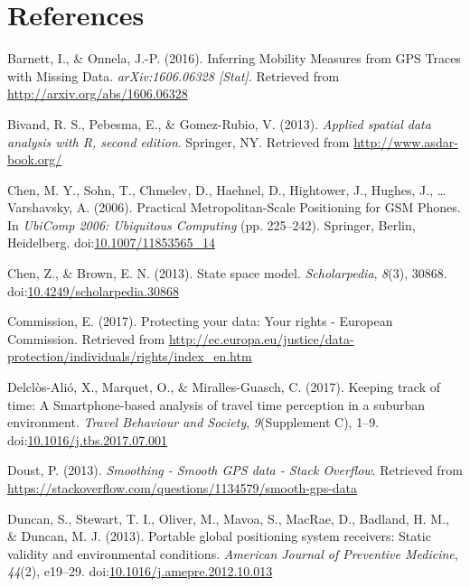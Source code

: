 \documentclass[english,man]{apa6}
\theoremstyle{definition}
\theoremstyle{definition}
\theoremstyle{definition}
\theoremstyle{remark}
\begin{document}
\newpage

\section{References}\label{references}

\setlength{\parindent}{-0.5in} \setlength{\leftskip}{0.5in}

\hypertarget{refs}{}
\hypertarget{ref-barnett_inferring_2016}{}
Barnett, I., \& Onnela, J.-P. (2016). Inferring Mobility Measures from
GPS Traces with Missing Data. \emph{arXiv:1606.06328 {[}Stat{]}}.
Retrieved from \url{http://arxiv.org/abs/1606.06328}

\hypertarget{ref-sp2}{}
Bivand, R. S., Pebesma, E., \& Gomez-Rubio, V. (2013). \emph{Applied
spatial data analysis with R, second edition}. Springer, NY. Retrieved
from \url{http://www.asdar-book.org/}

\hypertarget{ref-chen_practical_2006}{}
Chen, M. Y., Sohn, T., Chmelev, D., Haehnel, D., Hightower, J., Hughes,
J., \ldots{} Varshavsky, A. (2006). Practical Metropolitan-Scale
Positioning for GSM Phones. In \emph{UbiComp 2006: Ubiquitous Computing}
(pp. 225--242). Springer, Berlin, Heidelberg.
doi:\href{https://doi.org/10.1007/11853565_14}{10.1007/11853565\_14}

\hypertarget{ref-chen_state_2013}{}
Chen, Z., \& Brown, E. N. (2013). State space model.
\emph{Scholarpedia}, \emph{8}(3), 30868.
doi:\href{https://doi.org/10.4249/scholarpedia.30868}{10.4249/scholarpedia.30868}

\hypertarget{ref-commission_protecting_2017}{}
Commission, E. (2017). Protecting your data: Your rights - European
Commission. Retrieved from
\url{http://ec.europa.eu/justice/data-protection/individuals/rights/index_en.htm}

\hypertarget{ref-delclos-alio_keeping_2017}{}
Delclòs-Alió, X., Marquet, O., \& Miralles-Guasch, C. (2017). Keeping
track of time: A Smartphone-based analysis of travel time perception in
a suburban environment. \emph{Travel Behaviour and Society},
\emph{9}(Supplement C), 1--9.
doi:\href{https://doi.org/10.1016/j.tbs.2017.07.001}{10.1016/j.tbs.2017.07.001}

\hypertarget{ref-doust_smoothing_2013}{}
Doust, P. (2013). \emph{Smoothing - Smooth GPS data - Stack Overflow}.
Retrieved from
\url{https://stackoverflow.com/questions/1134579/smooth-gps-data}

\hypertarget{ref-duncan_portable_2013}{}
Duncan, S., Stewart, T. I., Oliver, M., Mavoa, S., MacRae, D., Badland,
H. M., \& Duncan, M. J. (2013). Portable global positioning system
receivers: Static validity and environmental conditions. \emph{American
Journal of Preventive Medicine}, \emph{44}(2), e19--29.
doi:\href{https://doi.org/10.1016/j.amepre.2012.10.013}{10.1016/j.amepre.2012.10.013}
\end{document}
